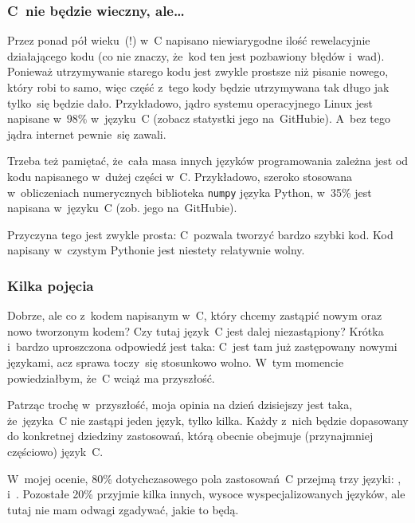 \documentclass[10pt,t]{beamer}
\begin{document}
\begin{frame}
  \frametitle{C~nie będzie wieczny, ale\ldots}


  Przez ponad pół wieku~(!) w~C napisano niewiarygodne ilość rewelacyjnie
  działającego kodu (co nie znaczy, że~kod ten jest pozbawiony błędów
  i~wad). Ponieważ utrzymywanie starego kodu jest zwykle prostsze niż
  pisanie nowego, który robi to samo, więc część z~tego kody będzie
  utrzymywana tak długo jak tylko~się będzie dało. Przykładowo, jądro
  systemu operacyjnego Linux jest napisane w~$98\%$ w~języku~C (zobacz
  statystki jego 
  na~GitHubie). A~bez tego jądra internet pewnie~się zawali.

  Trzeba też pamiętać, że~cała masa innych języków programowania zależna
  jest od kodu napisanego w~dużej części w~C. Przykładowo, szeroko stosowana
  w~obliczeniach numerycznych biblioteka \texttt{numpy} języka Python,
  w~35\% jest napisana w~języku~C (zob. jego
   na~GitHubie).

  Przyczyna tego jest zwykle prosta: C~pozwala tworzyć bardzo szybki kod.
  Kod napisany w~czystym Pythonie jest niestety relatywnie wolny.

\end{frame}





\begin{frame}
  \frametitle{Kilka pojęcia}


  Dobrze, ale co z~kodem napisanym w~C, który chcemy zastąpić nowym oraz
  nowo tworzonym kodem? Czy tutaj język~C jest dalej niezastąpiony? Krótka
  i~bardzo uproszczona odpowiedź jest taka: C~jest tam już zastępowany
  nowymi językami, acz sprawa toczy~się stosunkowo wolno. W~tym momencie
  powiedziałbym, że~C wciąż ma przyszłość.

  Patrząc trochę w~przyszłość, moja opinia na dzień dzisiejszy jest taka,
  że~języka~C \alert{nie} zastąpi jeden język, tylko kilka. Każdy z~nich
  będzie dopasowany do konkretnej dziedziny
  zastosowań, którą obecnie obejmuje (przynajmniej częściowo) język~C.

  W~mojej ocenie, 80\% dotychczasowego pola zastosowań~C przejmą trzy
  języki: ,
  i~. Pozostałe 20\% przyjmie kilka
  innych, wysoce wyspecjalizowanych języków, ale tutaj nie mam odwagi
  zgadywać, jakie to będą.

\end{frame}
\end{document}
